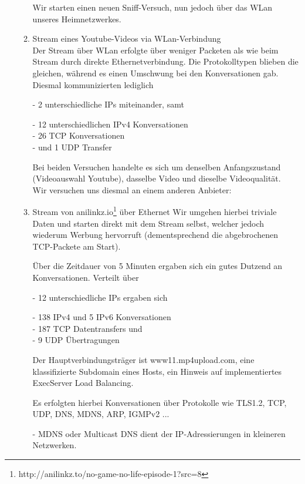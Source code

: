 \documentclass[11pt]{article}
\begin{document}
\begin{enumerate}
\begin{enumerate}[\thesection .1]
        Wir starten einen neuen Sniff-Versuch, nun jedoch über das WLan unseres Heimnetzwerkes.
        \item Stream eines Youtube-Videos via WLan-Verbindung\\
        Der Stream über WLan erfolgte über weniger Packeten als wie beim Stream durch direkte Ethernetverbindung.
        Die Protokolltypen blieben die gleichen, während es einen Umschwung bei den Konversationen gab.
        Diesmal kommunizierten lediglich
        \begin{addmargin}[1em]{1em}
            - 2 unterschiedliche IPs miteinander, samt
            \begin{addmargin}[1em]{1em}
                - 12 unterschiedlichen IPv4 Konversationen\\
                - 26 TCP Konversationen\\
                - und 1 UDP Transfer\\
            \end{addmargin}
        \end{addmargin}

            Bei beiden Versuchen handelte es sich um denselben Anfangszustand (Videoauswahl Youtube),
            dasselbe Video und dieselbe Videoqualität.\\

            Wir versuchen uns diesmal an einem anderen Anbieter:
            \item Stream von anilinkz.io\footnote[1]{http://anilinkz.to/no-game-no-life-episode-1?src=8} über Ethernet
            Wir umgehen hierbei triviale Daten und starten direkt mit dem Stream selbst, welcher jedoch wiederum Werbung hervorruft
            (dementsprechend die abgebrochenen TCP-Packete am Start).

            Über die Zeitdauer von 5 Minuten ergaben sich ein gutes Dutzend an Konversationen.
            Verteilt über
            \begin{addmargin}[1em]{1em}
                - 12 unterschiedliche IPs ergaben sich
                \begin{addmargin}[1em]{1em}
                    - 138 IPv4 und 5 IPv6 Konversationen\\
                    - 187 TCP Datentransfers und \\
                    - 9 UDP Übertragungen\\
                \end{addmargin}
            \end{addmargin}
            Der Hauptverbindungsträger ist www11.mp4upload.com, eine klassifizierte Subdomain eines Hosts, ein Hinweis auf implementiertes ExecServer Load Balancing.

            Es erfolgten hierbei Konversationen über Protokolle wie TLS1.2, TCP, UDP, DNS, MDNS, ARP, IGMPv2 ...
            \begin{addmargin}[1em]{1em}
                - MDNS oder Multicast DNS dient der IP-Adressierungen in kleineren Netzwerken.
            \end{addmargin}
        \end{enumerate}
    \end{enumerate}
\end{document}

